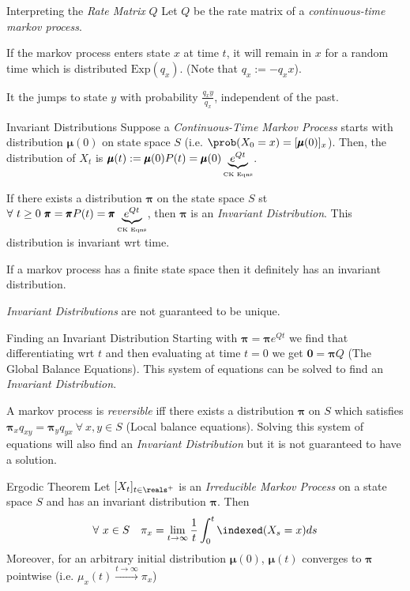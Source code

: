 \documentclass[11pt,a4paper]{article}
\begin{document}
  \begin{proposition}{Interpreting the \textit{Rate Matrix} $Q$}
    Let $Q$ be the rate matrix of a \textit{continuous-time markov process}.
    \par If the markov process enters state $x$ at time $t$, it will remain in $x$ for a random time which is distributed $\text{Exp}(q_x)$. (Note that $q_x:=-q_xx$).
    \par It the jumps to state $y$ with probability   $\frac{q_xy}{q_x}$, independent of the past.
  \end{proposition}

  \begin{definition}{Invariant Distributions}
    Suppose a \textit{Continuous-Time Markov Process} starts with distribution $\pmb\mu(0)$ on state space $S$ (i.e. $\prob(X_0=x)=[\pmb\mu(0)]_x$). Then, the distribution of $X_t$ is $\pmb\mu(t):=\pmb\mu(0)P(t)=\pmb\mu(0)\underbrace{e^{Qt}}_\text{\tiny CK Eqns}$.
    \par If there exists a distribution $\pmb\pi$ on the state space $S$ st $\forall\ t\geq0\ \pmb\pi=\pmb\pi P(t)=\pmb\pi \underbrace{e^{Qt}}_\text{\tiny CK Eqns}$, then $\pmb\pi$ is an \textit{Invariant Distribution}. This distribution is invariant wrt time.
    \par If a markov process has a finite state space then it definitely has an invariant distribution.
    \par \textit{Invariant Distributions} are not guaranteed to be unique.
  \end{definition}

  \begin{proposition}{Finding an Invariant Distribution}
    Starting with $\pmb\pi=\pmb\pi e^{Qt}$ we find that differentiating wrt $t$ and then evaluating at time $t=0$ we get $\pmb0=\pmb\pi Q$ (The Global Balance Equations). This system of equations can be solved to find an \textit{Invariant Distribution}.
    \par A markov process is \textit{reversible} iff there exists a distribution $\pmb\pi$ on $S$ which satisfies $\pmb\pi_xq_{xy}=\pmb\pi_yq_{yx}\ \forall\ x,y\in S$ (Local balance equations). Solving this system of equations will also find an \textit{Invariant Distribution} but it is not guaranteed to have a solution.
  \end{proposition}

  \begin{theorem}{Ergodic Theorem}
    Let $[X_t]_{t\in\reals^+}$ is an \textit{Irreducible Markov Process} on a state space $S$ and has an invariant distribution $\pmb\pi$. Then
    \[ \forall\ x\in S\quad\pi_x=\lim_{t\to\infty}\frac1t\int_0^t\indexed(X_s=x)ds \]
    Moreover, for an arbitrary initial distribution $\pmb\mu(0)$, $\pmb\mu(t)$ converges to $\pmb\pi$ pointwise (i.e. $\mu_x(t)\overset{t\to\infty}\longrightarrow\pi_x$)
  \end{theorem}
\end{document}
